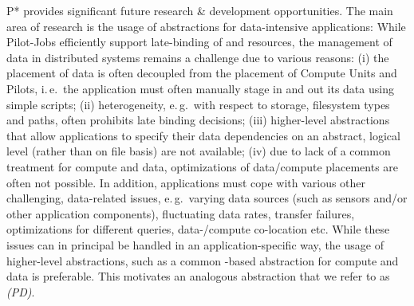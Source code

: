 \documentclass{sig-alternate}
\begin{document}
P* provides significant future research \& development
opportunities. The main area of research is the usage of \pilot
abstractions for data-intensive applications: While Pilot-Jobs
efficiently support late-binding of \computeunits and resources, the
management of data in distributed systems remains a challenge due to
various reasons: (i) the placement of data is often decoupled from the
placement of Compute Units and Pilots, i.\,e.\ the application must
often manually stage in and out its data using simple scripts; (ii)
heterogeneity, e.\,g.\ with respect to storage, filesystem types and
paths, often prohibits late binding decisions; (iii) higher-level
abstractions that allow applications to specify their data
dependencies on an abstract, logical level (rather than on file basis)
are not available; (iv) due to lack of a common treatment for compute
and data, optimizations of data/compute placements are often not
possible. In addition, applications must cope with various other
challenging, data-related issues, e.\,g.\ varying data sources (such
as sensors and/or other application components), fluctuating data
rates, transfer failures, optimizations for different queries,
data-/compute co-location etc. While these issues can in principal be
handled in an application-specific way, the usage of higher-level
abstractions, such as a common \pilot-based abstraction for compute
and data is preferable. This motivates an analogous abstraction that
we refer to as \emph{\pilotdata (PD)}.





 
\end{document}
